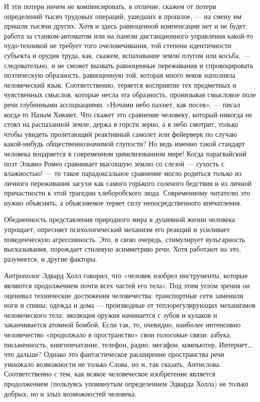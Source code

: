 И эти потери ничем не компенсировать, в отличие, скажем от потери определений
тысяч трудовых операций, ушедших в прошлое, --- на смену им пришли тысячи других.
Хотя и здесь равноценной компенсации нет и не будет: работа за
станком-автоматом или на панели дистанционного управления какой-то
чудо-техникой не требует того очеловечивания, той степени идентичности субъекта
и орудия труда, как, скажем, вспахивание земли плугом или косьба, —
следовательно, и не сможет вызвать равноценные переживания и спровоцировать
поэтическую образность, равноценную той, которая много веков наполняла
человеческий язык. Соответственно, теряется восприятие тех предметных и
чувственных смыслов, которые несла эта образность, пронизывая смысловое поле
речи глубинными ассоциациями. «Ночами небо пахнет, как посев», --- писал когда-то
Назым Хикмет. Что скажет это сравнение человеку, который никогда не стоял на
распаханной земле, держа в горсти зерно, а в небо смотрит, только чтобы увидеть
пролетающий реактивный самолет или фейерверк по случаю какой-нибудь
общественнозначимой глупости? Но ведь именно такой стандарт человека воцаряется
в современном цивилизованном мире! Когда парагвайский поэт Эльвио Ромео
сравнивает высохшую землю со слезой --- сухость с влажностью! --- то такое
парадоксальное сравнение могло родиться только из личного переживания засухи
как самого горького соленого бедствия и из личной причастности к этой трагедии
хлеборобского люда. Современному читателю это нужно объяснять, а объясняемое
теряет силу непосредственного впечатления.

Обедненность представления природного мира в душевной жизни человека упрощает,
опресняет психологический механизм его реакций и усиливает поведенческую
агрессивность. Это, в свою очередь, стимулирует вульгарность высказывания,
порождает стилевую асимметрию речи. Хотя работают на это, разумеется, и другие
факторы.

Антрополог Эдвард Холл говорил, что «человек изобрел инструменты, которые
являются продолжением почти всех частей его тела». Под этим углом зрения он
оценивал технические достижения человечества: транспортные сети заменили ноги и
спины; одежда и дома --- производные от теплорегулирующих механизмов
человеческого тела; эволюция оружия начинается с зубов и кулаков и
заканчивается атомной бомбой. Если так, то, очевидно, наиболее интенсивно
человечество «продолжало в пространство» свои голосовые связи: азбука,
письменность, книгопечатание, телефон, радио, мегафон, компьютер, Интернет… что
дальше? Однако это фантастическое расширение пространства речи умножало
возможности не только Слова, но и, так сказать, Антислова. Соответственно с
тем, как всякое человеческое изобретение является продолжением (пользуясь
упомянутым определением Эдварда Холла) не только добрых, но и злых возможностей
человека.


